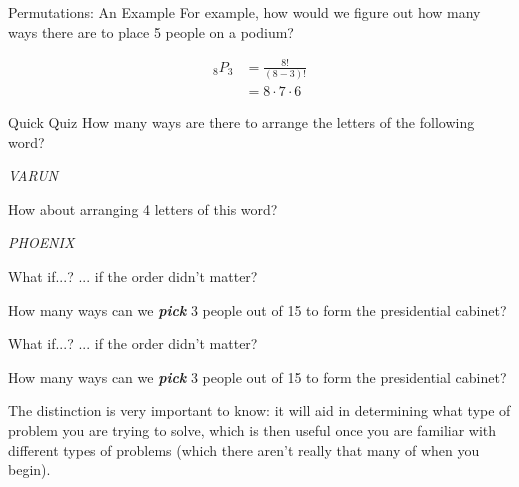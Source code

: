 \documentclass[aspectratio=169,xcolor=dvipsnames]{beamer}
\begin{document}
\begin{frame}[t]{Permutations: An Example}
    For example, how would we figure out how many ways there are to place 5 people on a podium?

    \vspace{2cm}
    \begin{align*}
        _8P_3
        &=\frac{8!}{(8-3)!}\\
        &=8\cdot7\cdot6
    \end{align*}
\end{frame}
\begin{frame}[t]{Quick Quiz}
    How many ways are there to arrange the letters of the following word?

    \vspace{0.5cm}
    \begin{center}
        \textit{VARUN}
    \end{center}
    
    \vspace{1cm}
    How about arranging 4 letters of this word?
    
    \vspace{0.5cm}
    \begin{center}
        \textit{PHOENIX}
    \end{center}
\end{frame}
\begin{frame}[t]{What if...?}
    ... if the order didn't matter?
    
    \vspace{.5em}
    
    How many ways can we \textit{\textbf{pick}} 3 people out of 15 to form the presidential cabinet?
\end{frame}

\begin{frame}[t]{What if...?}
    ... if the order didn't matter?
    
    \vspace{.5em}
    
    How many ways can we \textit{\textbf{pick}} 3 people out of 15 to form the presidential cabinet?

    \vspace{1.5cm}

    The distinction is very important to know: it will aid in determining what type of problem you are trying to solve, which is then useful once you are familiar with different types of problems (which there aren't really that many of when you begin).
\end{frame}
\end{document}
